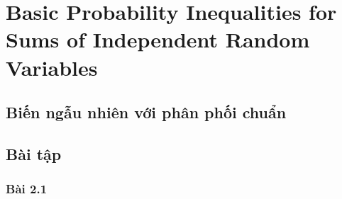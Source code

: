 \chapter{Basic Probability Inequalities for Sums of
Independent Random Variables}

\section{Biến ngẫu nhiên với phân phối chuẩn}

\section{Bài tập}

\subsection{Bài 2.1}
